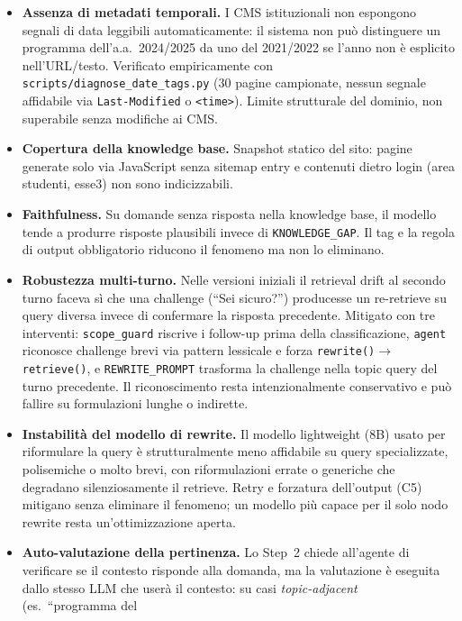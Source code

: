 \documentclass[11pt,a4paper]{article}
\newcommand{\code}[1]{\texttt{\small#1}}
\begin{document}
\begin{itemize}
  \item \textbf{Assenza di metadati temporali.} I CMS istituzionali non espongono segnali
    di data leggibili automaticamente: il sistema non può distinguere un programma
    dell'a.a.\ 2024/2025 da uno del 2021/2022 se l'anno non è esplicito nell'URL/testo.
    Verificato empiricamente con \code{scripts/diagnose\_date\_tags.py} (30 pagine
    campionate, nessun segnale affidabile via \texttt{Last-Modified} o \texttt{<time>}).
    Limite strutturale del dominio, non superabile senza modifiche ai CMS.
  \item \textbf{Copertura della knowledge base.} Snapshot statico del sito: pagine
    generate solo via JavaScript senza sitemap entry e contenuti dietro login (area
    studenti, esse3) non sono indicizzabili.
  \item \textbf{Faithfulness.} Su domande senza risposta nella knowledge base, il
    modello tende a produrre risposte plausibili invece di \texttt{KNOWLEDGE\_GAP}. Il
    tag e la regola di output obbligatorio riducono il fenomeno ma non lo eliminano.
  \item \textbf{Robustezza multi-turno.} Nelle versioni iniziali il retrieval drift al
    secondo turno faceva sì che una challenge (``Sei sicuro?'') producesse un re-retrieve
    su query diversa invece di confermare la risposta precedente. Mitigato con tre
    interventi: \code{scope\_guard} riscrive i follow-up prima della classificazione,
    \code{agent} riconosce challenge brevi via pattern lessicale e forza
    \code{rewrite()}$\to$\code{retrieve()}, e \code{REWRITE\_PROMPT} trasforma la
    challenge nella topic query del turno precedente. Il riconoscimento resta
    intenzionalmente conservativo e può fallire su formulazioni lunghe o indirette.
  \item \textbf{Instabilità del modello di rewrite.} Il modello lightweight (8B) usato
    per riformulare la query è strutturalmente meno affidabile su query specializzate,
    polisemiche o molto brevi, con riformulazioni errate o generiche che degradano
    silenziosamente il retrieve. Retry e forzatura dell'output (C5) mitigano senza
    eliminare il fenomeno; un modello più capace per il solo nodo rewrite resta
    un'ottimizzazione aperta.
  \item \textbf{Auto-valutazione della pertinenza.} Lo Step~2 chiede all'agente di
    verificare se il contesto risponde alla domanda, ma la valutazione è eseguita dallo
    stesso LLM che userà il contesto: su casi \emph{topic-adjacent} (es.\ ``programma del

\end{itemize}
\end{document}
